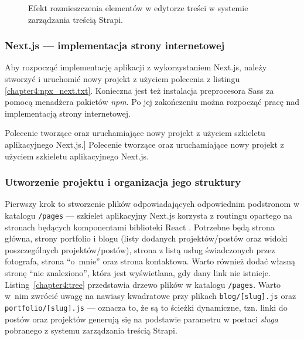 \documentclass[a4paper, 12pt, twoside]{article}
\numberwithin{figure}{section}
\begin{document}
\begin{sloppypar}
\begin{figure}[H] 
    \centering
   \caption{Efekt rozmieszczenia elementów w edytorze treści w systemie zarządzania treścią Strapi.}
   \label{fig:strapi-interface-4.jpg}
\end{figure}

\subsubsection{Next.js --- implementacja strony internetowej}
Aby rozpocząć implementację aplikacji z wykorzystaniem Next.js, należy stworzyć i uruchomić nowy projekt z użyciem polecenia z listingu \ref{chapter4:npx_next.txt}. Konieczna jest też instalacja preprocesora Sass za pomocą menadżera pakietów \textit{npm}. Po jej zakończeniu można rozpocząć pracę nad implementacją strony internetowej.

\begin{code}[htbp]
    
    \caption
    [Polecenie tworzące oraz uruchamiające nowy projekt z użyciem szkieletu aplikacyjnego Next.js.]
    {Polecenie tworzące oraz uruchamiające nowy projekt z użyciem szkieletu aplikacyjnego Next.js.}
    \label{chapter4:npx_next.txt}
\end{code}

\subsubsection*{Utworzenie projektu i organizacja jego struktury}
 Pierwszy krok to stworzenie plików odpowiadających odpowiednim podstronom w katalogu \texttt{/pages} --- szkielet aplikacyjny Next.js korzysta z routingu opartego na stronach będących komponentami biblioteki React \cite{nextdocs}. Potrzebne będą strona główna, strony portfolio i blogu (listy dodanych projektów/postów oraz widoki poszczególnych projektów/postów), strona z listą usług świadczonych przez fotografa, strona ``o~mnie'' oraz strona kontaktowa. Warto również dodać własną stronę ``nie znaleziono'', która jest wyświetlana, gdy dany link nie istnieje. Listing~\ref{chapter4:tree} przedstawia drzewo plików w katalogu \texttt{/pages}. Warto w~nim zwrócić uwagę na nawiasy kwadratowe przy plikach \texttt{blog/[slug].js} oraz \texttt{portfolio/[slug].js} --- oznacza to, że są to ścieżki dynamiczne, tzn. linki do postów oraz projektów generują się na podstawie parametru w postaci \textit{sluga} pobranego z systemu zarządzania treścią Strapi. 


\end{sloppypar}
\end{document}
